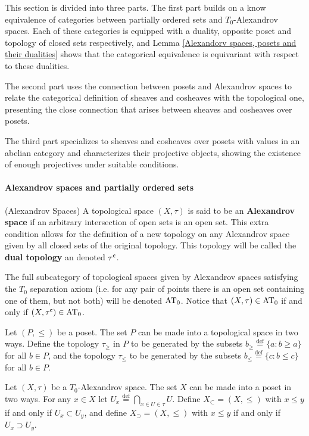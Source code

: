 \documentclass[main.tex]{subfiles}
\begin{document}
This section is divided into three parts. The first part builds on a know equivalence of categories between partially ordered sets and $T_0$-Alexandrov spaces. Each of these categories is equipped with a duality, opposite poset and topology of closed sets respectively, and Lemma \ref{Alexandorv spaces, posets and their dualities} shows that the categorical equivalence is equivariant with respect to these dualities.

The second part uses the connection between posets and Alexandrov spaces to relate the categorical definition of sheaves and cosheaves with the topological one, presenting the close connection that arises between sheaves and cosheaves over posets.

The third part specializes to sheaves and cosheaves over posets with values in an abelian category and characterizes their projective objects, showing the existence of enough projectives under suitable conditions.

\paragraph{Alexandrov spaces and partially ordered sets}
\begin{defn}(Alexandrov Spaces) A topological space $(X,\tau)$ is said to be an \textbf{Alexandrov space} if an arbitrary intersection of open sets is an open set. This extra condition allows for the definition of a new topology on any Alexandrov space given by all closed sets of the original topology. This topology will be called the \textbf{dual topology} an denoted $\tau^{\mathsf{c}}$.

The full subcategory of topological spaces given by Alexandrov spaces satisfying the $T_0$ separation axiom (i.e.\! for any pair of points there is an open set containing one of them, but not both) will be denoted $\AT_0$. Notice that $(X,\tau)\in\AT_0$ if and only if $(X,\tau^{\c})\in\AT_0$.
\end{defn}

\begin{defn}
Let $(P,\leq)$ be a poset. The set $P$ can be made into a topological space in two ways.
Define the topology $\tau_\geq$ in $P$ to be generated by the subsets $b_\geq\stackrel{\mathrm{def}}{=}\{a:b\geq a\}$ for all $b\in P$, and the topology $\tau_\leq$ to be generated by the subsets $b_\leq\stackrel{\mathrm{def}}{=}\{c:b\leq c\}$ for all $b\in P$.\vspace*{6pt}

Let $(X,\tau)$ be a $T_0$-Alexandrov space. The set $X$ can be made into a poset in two ways.
For any $x\in X$ let $U_x\stackrel{\mathrm{def}}{=}\bigcap_{x\in U\in\tau}U$.
Define $X_\subset=(X,\leq)$ with $x\leq y$ if and only if $U_x\subset U_y$, and define $X_\supset=(X,\leq)$ with $x\leq y$ if and only if $U_x\supset U_y$.
\end{defn}
\end{document}
